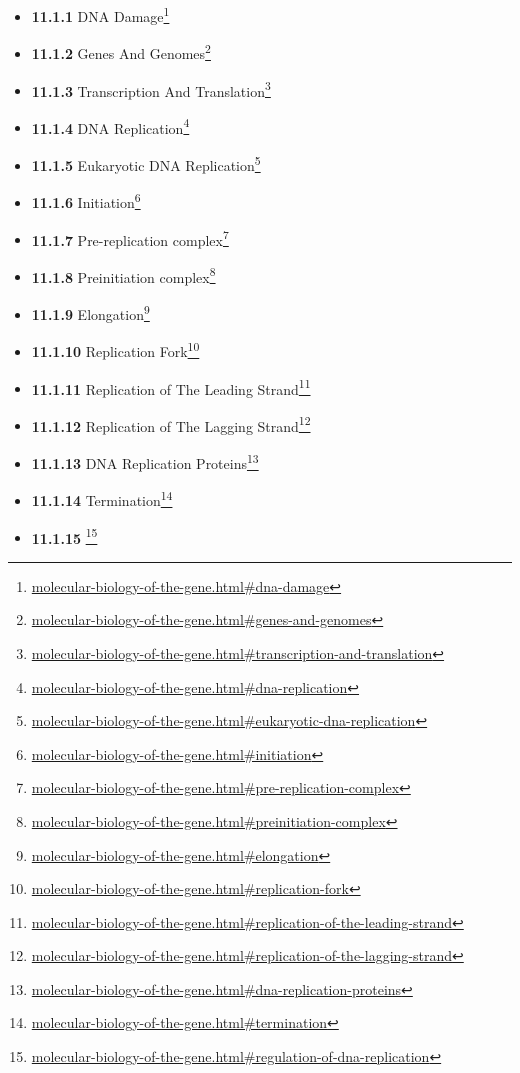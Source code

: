 \documentclass[
]{article}
\providecommand{\tightlist}{%
  \setlength{\itemsep}{0pt}\setlength{\parskip}{0pt}}
\providecommand{\tightlist}{%
  \setlength{\itemsep}{0pt}\setlength{\parskip}{0pt}}
\let\rmarkdownfootnote\footnote%
\def\footnote{\protect\rmarkdownfootnote}
\renewcommand{\href}[2]{#2\footnote{\url{#1}}}
\theoremstyle{definition}
\theoremstyle{definition}
\theoremstyle{definition}
\theoremstyle{remark}
\begin{document}
\begin{itemize}
\begin{itemize}
    \begin{itemize}
    \tightlist
    \item
      \href{molecular-biology-of-the-gene.html\#dna-damage}{\emph{}\textbf{11.1.1}
      DNA Damage}
    \item
      \href{molecular-biology-of-the-gene.html\#genes-and-genomes}{\emph{}\textbf{11.1.2}
      Genes And Genomes}
    \item
      \href{molecular-biology-of-the-gene.html\#transcription-and-translation}{\emph{}\textbf{11.1.3}
      Transcription And Translation}
    \item
      \href{molecular-biology-of-the-gene.html\#dna-replication}{\emph{}\textbf{11.1.4}
      DNA Replication}
    \item
      \href{molecular-biology-of-the-gene.html\#eukaryotic-dna-replication}{\emph{}\textbf{11.1.5}
      Eukaryotic DNA Replication}
    \item
      \href{molecular-biology-of-the-gene.html\#initiation}{\emph{}\textbf{11.1.6}
      Initiation}
    \item
      \href{molecular-biology-of-the-gene.html\#pre-replication-complex}{\emph{}\textbf{11.1.7}
      Pre-replication complex}
    \item
      \href{molecular-biology-of-the-gene.html\#preinitiation-complex}{\emph{}\textbf{11.1.8}
      Preinitiation complex}
    \item
      \href{molecular-biology-of-the-gene.html\#elongation}{\emph{}\textbf{11.1.9}
      Elongation}
    \item
      \href{molecular-biology-of-the-gene.html\#replication-fork}{\emph{}\textbf{11.1.10}
      Replication Fork}
    \item
      \href{molecular-biology-of-the-gene.html\#replication-of-the-leading-strand}{\emph{}\textbf{11.1.11}
      Replication of The Leading Strand}
    \item
      \href{molecular-biology-of-the-gene.html\#replication-of-the-lagging-strand}{\emph{}\textbf{11.1.12}
      Replication of The Lagging Strand}
    \item
      \href{molecular-biology-of-the-gene.html\#dna-replication-proteins}{\emph{}\textbf{11.1.13}
      DNA Replication Proteins}
    \item
      \href{molecular-biology-of-the-gene.html\#termination}{\emph{}\textbf{11.1.14}
      Termination}
    \item
      \href{molecular-biology-of-the-gene.html\#regulation-of-dna-replication}{\emph{}\textbf{11.1.15}
}
\end{itemize}
\end{itemize}
\end{itemize}
\end{document}
